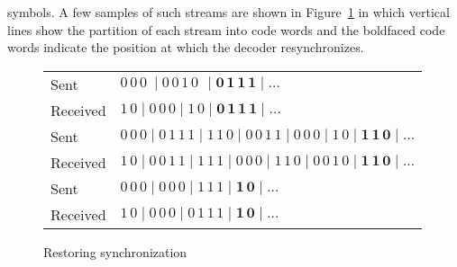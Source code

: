 \documentclass{irmaart}
\begin{document}
symbols. A few samples of such streams are shown in
Figure~\ref{KV:fig:decoding} in which vertical lines show the
partition of each stream into code words and the boldfaced code
words indicate the position at which the decoder resynchronizes.
\begin{figure}[h]
\begin{center}
\begin{tabular}{ll}
Sent & $0\,0\,0\ \mid 0\,0\,1\,0\,\ \mid\mathbf{0\,1\,1\,1\mid\dots}$\\
\mathstrut Received & $1\,0\mid 0\,0\,0 \mid 1\,0 \mid\mathbf{0\,1\,1\,1\mid\dots}$\\
\hline
\mathstrut Sent & $0\,0\,0\mid 0\,1\,1\,1 \mid 1\,1\,0\mid 0\,0\,1\,1 \mid 0\,0\,0 \mid 1\,0 \mid\mathbf{1\,1\,0\mid \dots}$\\
\mathstrut Received & $1\,0\mid 0\,0\,1\,1 \mid 1\,1\,1 \mid 0\,0\,0\mid 1\,1\,0 \mid 0\,0\,1\,0 \mid\mathbf{1\,1\,0\mid \dots}$\\
\hline
\mathstrut Sent & $0\,0\,0\mid 0\,0\,0 \mid 1\,1\,1\mid\mathbf{1\,0\mid \dots}$\\
\mathstrut Received & $1\,0\mid 0\,0\,0 \mid 0\,1\,1\,1 \mid\mathbf{1\,0\mid \dots}$
\end{tabular}
\caption{Restoring synchronization}\label{KV:fig:decoding}
\end{center}
\end{figure}
\end{document}
